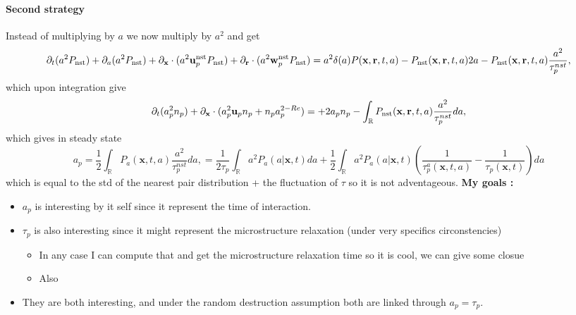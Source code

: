 {\paragraph*{Second strategy}
Instead of multiplying by $a$ we now multiply by $a^2$ and get
\begin{equation*}
    \partial_t (a^2 P_\text{nst})
    + \partial_a (a^2 P_\text{nst})
    + {\partial_\textbf{x}} \cdot  ( a^2 \textbf{u}^\text{nst}_p  P_\text{nst})
    + {\partial_\textbf{r}} \cdot  ( a^2 \textbf{w}^\text{nst}_p  P_\text{nst})
    = a^2 \delta(a) P(\textbf{x},\textbf{r},t,a)
    - P_\text{nst}(\textbf{x},\textbf{r},t,a) 2 a
    - P_\text{nst}(\textbf{x},\textbf{r},t,a) \frac{a^2}{\tau_p^{nst}},
\end{equation*}
which upon integration give
\begin{equation*}
    \partial_t (a^2_p n_p)
    + {\partial_\textbf{x}} \cdot  ( a^2_p \textbf{u}_p  n_p + n_p a^{2-Re}_p)
    = 
    + 2 a_p n_p
    - \int_\mathbb{R} P_\text{nst}(\textbf{x},\textbf{r},t,a) \frac{a^2}{\tau_p^{nst}} da,
\end{equation*}
which gives in steady state 
\begin{equation}
    a_p
    = 
    \frac{1}{2}
    \int_\mathbb{R}
    P_a(\textbf{x},t,a) \frac{a^2}{\tau_p^{nst}} da,
    = \frac{1}{2\tau_p}
    \int_\mathbb{R}
    a^2 P_a(a|\textbf{x},t) da
    +  \frac{1}{2}
    \int_{\mathbb{R}} a^2 P_a(a|\textbf{x},t)\left(
        \frac{1}{\tau_p^a(\textbf{x},t,a)} 
        - \frac{1}{\tau_p(\textbf{x},t)} 
    \right) da
\end{equation}
which is equal to the std of the nearest pair distribution + the fluctuation of $\tau$ so it is not  adventageous. 
\textbf{My goals : }
\begin{itemize}
    \item $a_p$ is interesting by it self since it represent the time of interaction. 
    \item $\tau_p$ is also interesting since it might represent the microstructure relaxation (under very specifics circonstencies)
    \begin{itemize}
        \item In any case I can compute that and get the microstructure relaxation time so it is cool, we can give some closue
        \item Also 
    \end{itemize}
    \item They are both interesting, and under the random destruction assumption both are linked through $a_p = \tau_p$. 
\end{itemize}

}
